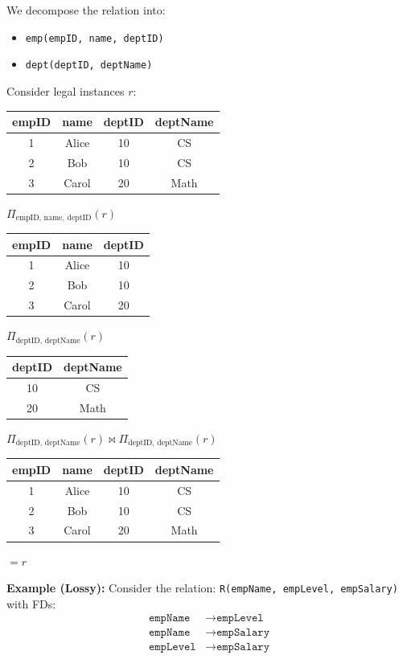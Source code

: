 \documentclass{article}
\begin{document}
We decompose the relation into:
\begin{itemize}
  \item \texttt{emp(empID, name, deptID)}
  \item \texttt{dept(deptID, deptName)}
\end{itemize}
Consider legal instances $r$:
\begin{tabular}{cccc}
\toprule
\textbf{empID} & \textbf{name} & \textbf{deptID} & \textbf{deptName} \\
\midrule
1 & Alice & 10 & CS \\
2 & Bob & 10 & CS \\
3 & Carol & 20 & Math \\
\bottomrule
\end{tabular}

$\Pi_{\text{empID, name, deptID}}(r)$
\begin{tabular}{ccc}
\toprule
\textbf{empID} & \textbf{name} & \textbf{deptID} \\
\midrule
1 & Alice & 10 \\
2 & Bob & 10 \\
3 & Carol & 20 \\
\bottomrule
\end{tabular}

$\Pi_{\text{deptID, deptName}}(r)$
\begin{tabular}{cc}
\toprule
\textbf{deptID} & \textbf{deptName} \\
\midrule
10 & CS \\
20 & Math \\
\bottomrule
\end{tabular}

$\Pi_{\text{deptID, deptName}}(r) \Join \Pi_{\text{deptID, deptName}}(r)$
\begin{tabular}{cccc}
\toprule
\textbf{empID} & \textbf{name} & \textbf{deptID} & \textbf{deptName} \\
\midrule
1 & Alice & 10 & CS \\
2 & Bob & 10 & CS \\
3 & Carol & 20 & Math \\
\bottomrule
\end{tabular}
$=r$

\textbf{Example (Lossy): }Consider the relation: \texttt{R(empName, empLevel, empSalary)} with FDs: 
\begin{align*}
\texttt{empName} &\to \texttt{empLevel} \\
\texttt{empName} &\to \texttt{empSalary} \\
\texttt{empLevel} &\to \texttt{empSalary}
\end{align*}
\end{document}
